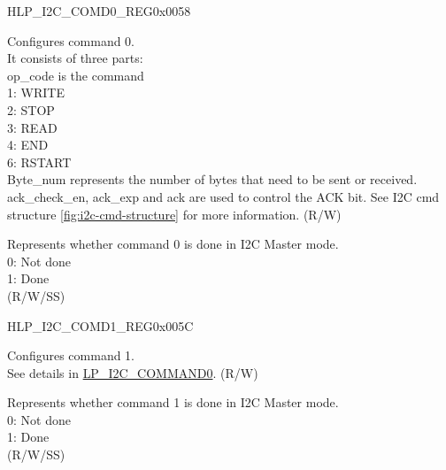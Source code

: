     \begin{register}{H}{LP\_I2C\_COMD0\_REG}{0x0058}\label{regdesc:LPI2CCOMD0REG}
    \regnewline%
    \begin{regdesc}\begin{reglist}
    \label{fielddesc:LPI2CCOMMAND0}\item [LP\_I2C\_COMMAND0] Configures command 0. \\
    It consists of three parts:\\
    op\_code is the command\\
    1: WRITE\\
    2: STOP\\
    3: READ\\
    4: END\\
    6: RSTART\\
    Byte\_num represents the number of bytes that need to be sent or received.\\
    ack\_check\_en, ack\_exp and ack are used to control the ACK bit. See I2C cmd structure \ref{fig:i2c-cmd-structure} for more information. (R/W)
    \label{fielddesc:LPI2CCOMMAND0DONE}\item [LP\_I2C\_COMMAND0\_DONE] Represents whether command 0 is done in I2C Master mode.\\
    0: Not done \\
    1: Done \\ (R/W/SS)
    \end{reglist}\end{regdesc}
    \end{register}


    \begin{register}{H}{LP\_I2C\_COMD1\_REG}{0x005C}\label{regdesc:LPI2CCOMD1REG}
    \regnewline%
    \begin{regdesc}\begin{reglist}
    \label{fielddesc:LPI2CCOMMAND1}\item [LP\_I2C\_COMMAND1] Configures command 1.\\
    See details in \hyperref[fielddesc:LPI2CCOMMAND0]{LP\_I2C\_COMMAND0}. (R/W)
    \label{fielddesc:LPI2CCOMMAND1DONE}\item [LP\_I2C\_COMMAND1\_DONE] Represents whether command 1 is done in I2C Master mode.\\
    0: Not done \\
    1: Done \\ (R/W/SS)
    \end{reglist}\end{regdesc}
    \end{register}


